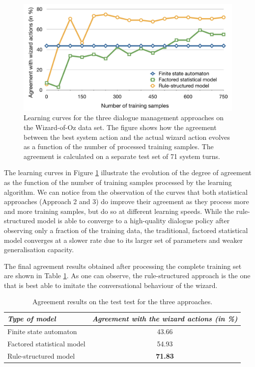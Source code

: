 \begin{figure}[ht]
\vspace{3mm}\centering\includegraphics[scale=0.35]{imgs/curve-exp3.pdf}
\caption{Learning curves for the three dialogue management approaches on the Wizard-of-Oz data set.  The figure shows how the agreement between the best system action and the actual wizard action evolves as a function of the number of processed training samples.  The agreement is calculated on a separate test set of 71 system turns.}
\label{fig:curve-exp3}
\end{figure}


The learning curves in Figure \ref{fig:curve-exp3} illustrate the evolution of the degree of agreement as the function of the number of training samples processed by the learning algorithm.  We can notice from the observation of the curves that both statistical approaches (Approach 2 and 3) do improve their agreement as they process more and more training samples, but do so at different learning speeds.  While the rule-structured model is able to converge to a high-quality dialogue policy after observing only a fraction of the training data, the traditional, factored statistical model converges at a slower rate due to its larger set of parameters and weaker generalisation capacity.

The final agreement results obtained after processing the complete training set are shown in Table \ref{table:learning-exp3}.  As one can observe, the rule-structured approach is the one that is best able to imitate the conversational behaviour of the wizard. 

\begin{table}[ht]
\begin{center}
\begin{tabular}{|l|c|} \hline
\textit{Type of model} & \textit{Agreement with the wizard actions (in \%) } \\ \hline \hline
Finite state automaton & 43.66 \\ \hline
Factored statistical model & 54.93 \\ \hline
Rule-structured model & \textbf{71.83} \\ \hline
\end{tabular}
\end{center}
\vspace{-2mm}
\caption{Agreement results on the test test for the three approaches.}
\vspace{-2mm}
\label{table:learning-exp3}
\end{table}

